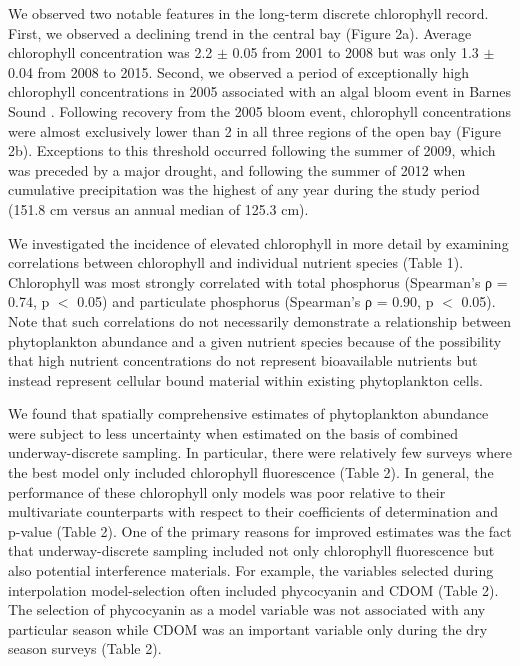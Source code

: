 \documentclass[review]{elsarticle}
\begin{document}
We observed two notable features in the long-term discrete chlorophyll record. First, we observed a declining trend in the central bay (Figure 2a). Average chlorophyll concentration was 2.2 $\pm$ 0.05 from 2001 to 2008 but was only 1.3 $\pm$ 0.04 from 2008 to 2015. Second, we observed a period of exceptionally high chlorophyll concentrations in 2005 associated with an algal bloom event in Barnes Sound \citep{rudnick_2006}. Following recovery from the 2005 bloom event, chlorophyll concentrations were almost exclusively lower than 2 in all three regions of the open bay (Figure 2b). Exceptions to this threshold occurred following the summer of 2009, which was preceded by a major drought, and following the summer of 2012 when cumulative precipitation was the highest of any year during the study period (151.8 cm versus an annual median of 125.3 cm).

We investigated the incidence of elevated chlorophyll in more detail by examining correlations between chlorophyll and individual nutrient species (Table 1). Chlorophyll was most strongly correlated with total phosphorus (Spearman’s ρ = 0.74, p $<$ 0.05) and particulate phosphorus (Spearman’s ρ = 0.90, p $<$ 0.05). Note that such correlations do not necessarily demonstrate a relationship between phytoplankton abundance and a given nutrient species because of the possibility that high nutrient concentrations do not represent bioavailable nutrients but instead represent cellular bound material within existing phytoplankton cells.  

We found that spatially comprehensive estimates of phytoplankton abundance were subject to less uncertainty when estimated on the basis of combined underway-discrete sampling. In particular, there were relatively few surveys where the best model only included chlorophyll fluorescence (Table 2). In general, the performance of these chlorophyll only models was poor relative to their multivariate counterparts with respect to their coefficients of determination and p-value (Table 2). One of the primary reasons for improved estimates was the fact that underway-discrete sampling included not only chlorophyll fluorescence but also potential interference materials. For example, the variables selected during interpolation model-selection often included phycocyanin and CDOM (Table 2). The selection of phycocyanin as a model variable was not associated with any particular season while CDOM was an important variable only during the dry season surveys (Table 2). 
\end{document}
